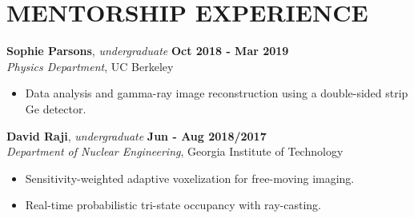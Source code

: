 \section{\small{MENTORSHIP EXPERIENCE}}

\textbf{Sophie Parsons}, \textsl{undergraduate} \hfill \textbf{Oct 2018 - Mar 2019} \\
\textsl{Physics Department}, UC Berkeley \\[-2.8ex]
\vspace{2pt}
\begin{itemize}[leftmargin=4ex] \itemsep -2pt
    \item Data analysis and gamma-ray image reconstruction using a double-sided strip Ge detector.
\end{itemize}

\textbf{David Raji}, \textsl{undergraduate} \hfill \textbf{Jun - Aug 2018/2017 } \\
\textsl{Department of Nuclear Engineering}, Georgia Institute of Technology \\[-2.8ex]
\vspace{2pt}
\begin{itemize}[leftmargin=4ex] \itemsep -2pt
    \item Sensitivity-weighted adaptive voxelization for free-moving imaging.
    \item Real-time probabilistic tri-state occupancy with ray-casting.
\end{itemize}
